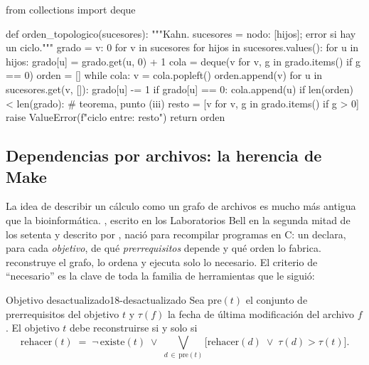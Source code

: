 \begin{codigo}[kahn.py]
from collections import deque

def orden_topologico(sucesores):
    """Kahn. sucesores = {nodo: [hijos]}; error si hay un ciclo."""
    grado = {v: 0 for v in sucesores}
    for hijos in sucesores.values():
        for u in hijos:
            grado[u] = grado.get(u, 0) + 1
    cola = deque(v for v, g in grado.items() if g == 0)
    orden = []
    while cola:
        v = cola.popleft()
        orden.append(v)
        for u in sucesores.get(v, []):
            grado[u] -= 1
            if grado[u] == 0:
                cola.append(u)
    if len(orden) < len(grado):                 # teorema, punto (iii)
        resto = [v for v, g in grado.items() if g > 0]
        raise ValueError(f"ciclo entre: {resto}")
    return orden
\end{codigo}

\subsection{Dependencias por archivos: la herencia de Make}

La idea de describir un cálculo como un grafo de archivos es mucho más antigua que la bioinformática. , escrito en los Laboratorios Bell en la segunda mitad de los setenta y descrito por \textcite{c18-feldman1979}, nació para recompilar programas en C: un  declara, para cada \emph{objetivo}, de qué \emph{prerrequisitos} depende y qué orden lo fabrica.  reconstruye el grafo, lo ordena y ejecuta solo lo necesario. El criterio de ``necesario'' es la clave de toda la familia de herramientas que le siguió:

\begin{definicion}{Objetivo desactualizado}{18-desactualizado}
Sea $\mathrm{pre}(t)$ el conjunto de prerrequisitos del objetivo $t$ y $\tau(f)$ la fecha de última modificación del archivo $f$. El objetivo $t$ debe reconstruirse si y solo si
\begin{equation}\label{eq:18-make}
\mathrm{rehacer}(t) \;=\; \neg\,\mathrm{existe}(t)\;\lor\;\bigvee_{d\,\in\,\mathrm{pre}(t)}\Big[\mathrm{rehacer}(d)\;\lor\;\tau(d)>\tau(t)\Big].
\end{equation}
\end{definicion}

\begin{simbolos}
\end{simbolos}

